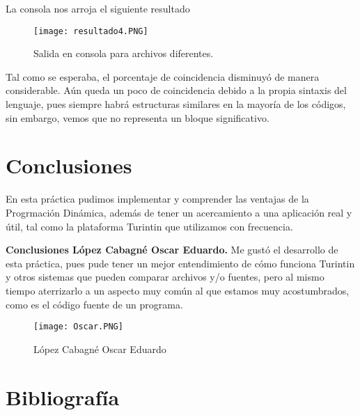 \documentclass[12pt,twoside]{article}
\begin{document}
\vspace{0cm}

\newpage

La consola nos arroja el siguiente resultado

\vspace{0cm}

\begin{figure}[htb]
\centering
\texttt{[image: resultado4.PNG]}
\caption{Salida en consola para archivos diferentes.}
\end{figure}

\vspace{0cm}

Tal como se esperaba, el porcentaje de coincidencia disminuy\'o de manera considerable. A\'un queda un poco de coincidencia debido a la propia sintaxis del lenguaje, pues siempre habr\'a estructuras similares en la mayor\'ia de los c\'odigos, sin embargo, vemos que no representa un bloque significativo. 

\newpage

\section{Conclusiones}
En esta pr\'actica pudimos implementar y comprender las ventajas de la Progrmaci\'on Din\'amica, adem\'as de tener un acercamiento a una aplicaci\'on real y \'util, tal como la plataforma Turintin que utilizamos con frecuencia. 

\vspace{5mm} %

\textbf{Conclusiones L\'opez Cabagn\'e Oscar Eduardo.} Me gust\'o el desarrollo de esta pr\'actica, pues pude tener un mejor entendimiento de c\'omo funciona Turintin y otros sistemas que pueden comparar archivos y/o fuentes, pero al mismo tiempo aterrizarlo a un aspecto muy com\'un  al que estamos muy acostumbrados, como es el c\'odigo fuente de un programa. 

\vspace{5mm} %

\begin{figure}[htb]
\centering
\texttt{[image: Oscar.PNG]}
\caption{L\'opez Cabagn\'e Oscar Eduardo}
\end{figure}

\newpage

\section{Bibliograf\'ia}
\end{document}
